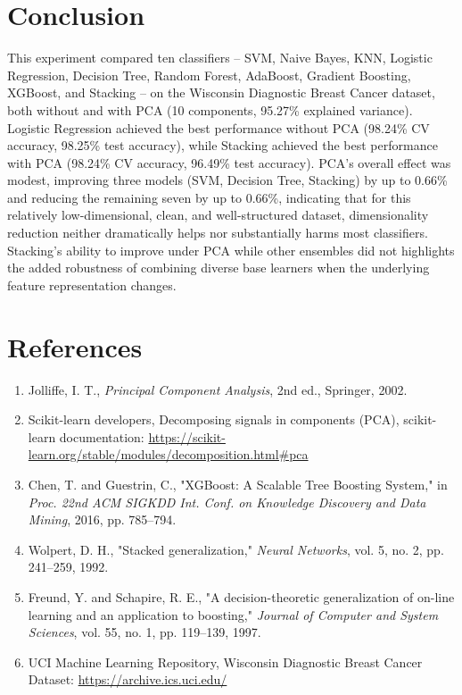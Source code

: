 \documentclass[12pt,a4paper]{article}
\begin{document}
\section{Conclusion}
This experiment compared ten classifiers -- SVM, Naive Bayes, KNN, Logistic Regression, Decision Tree, Random Forest, AdaBoost, Gradient Boosting, XGBoost, and Stacking -- on the Wisconsin Diagnostic Breast Cancer dataset, both without and with PCA (10 components, 95.27\% explained variance). Logistic Regression achieved the best performance without PCA (98.24\% CV accuracy, 98.25\% test accuracy), while Stacking achieved the best performance with PCA (98.24\% CV accuracy, 96.49\% test accuracy). PCA's overall effect was modest, improving three models (SVM, Decision Tree, Stacking) by up to 0.66\% and reducing the remaining seven by up to 0.66\%, indicating that for this relatively low-dimensional, clean, and well-structured dataset, dimensionality reduction neither dramatically helps nor substantially harms most classifiers. Stacking's ability to improve under PCA while other ensembles did not highlights the added robustness of combining diverse base learners when the underlying feature representation changes.

\section{References}
\begin{enumerate}
\item Jolliffe, I. T., \textit{Principal Component Analysis}, 2nd ed., Springer, 2002.

\item Scikit-learn developers, Decomposing signals in components (PCA), scikit-learn documentation: \url{https://scikit-learn.org/stable/modules/decomposition.html#pca}

\item Chen, T. and Guestrin, C., "XGBoost: A Scalable Tree Boosting System," in \textit{Proc. 22nd ACM SIGKDD Int. Conf. on Knowledge Discovery and Data Mining}, 2016, pp. 785--794.

\item Wolpert, D. H., "Stacked generalization," \textit{Neural Networks}, vol. 5, no. 2, pp. 241--259, 1992.

\item Freund, Y. and Schapire, R. E., "A decision-theoretic generalization of on-line learning and an application to boosting," \textit{Journal of Computer and System Sciences}, vol. 55, no. 1, pp. 119--139, 1997.

\item UCI Machine Learning Repository, Wisconsin Diagnostic Breast Cancer Dataset: \url{https://archive.ics.uci.edu/}
\end{enumerate}
\end{document}
